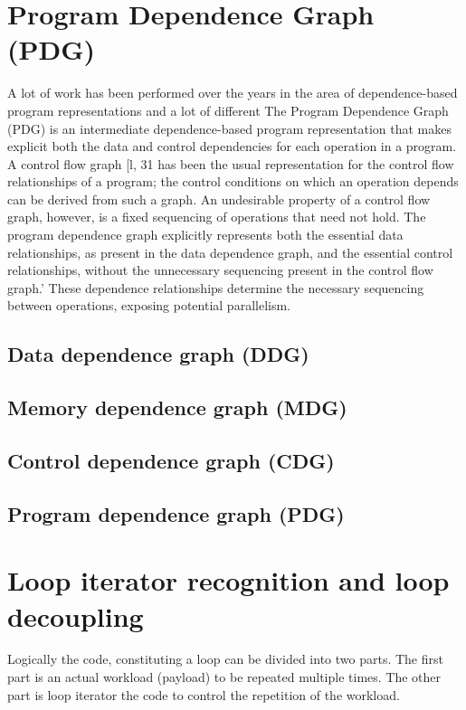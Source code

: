 \section{Program Dependence Graph (PDG)} \label{background-program-dependence-graph}
\qquad A lot of work has been performed over the years in the area of dependence-based program representations and a lot of different  \newline 
\null\qquad The Program Dependence Graph (PDG) is an intermediate dependence-based program representation that makes explicit both the data and control dependencies for each operation in a program. A control flow graph [l, 31 has
been the usual representation for the control flow relationships of a program; the control conditions on which an operation depends can be derived from such a
graph. An undesirable property of a control flow graph, however, is a fixed
sequencing of operations that need not hold. The program dependence graph
explicitly represents both the essential data relationships, as present in the data dependence graph, and the essential control relationships, without the unnecessary sequencing present in the control flow graph.’ These dependence relationships determine the necessary sequencing between operations, exposing potential parallelism. 




\subsection{Data dependence graph (DDG)} \label{background-ddg}
\subsection{Memory dependence graph (MDG)} \label{background-mdg}
\subsection{Control dependence graph (CDG)} \label{background-cdg}
\subsection{Program dependence graph (PDG)} \label{background-pdg}

\section{Loop iterator recognition and loop decoupling} \label{background-loop-decoupling}
\qquad Logically the code, constituting a loop can be divided into two parts. The first part is an actual workload (payload) to be repeated multiple times. The other part is loop iterator the code to control the repetition of the workload.    

\cite{iterator-recognition-paper}

